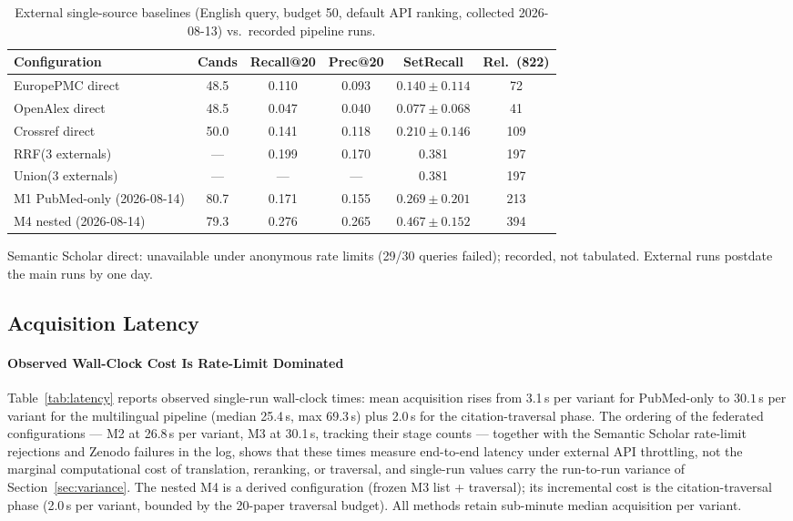 \documentclass[nonacm,sigconf]{acmart}
\begin{document}
\begin{table}[t]
\centering
\small
\setlength{\tabcolsep}{3.6pt}
\begin{threeparttable}
\caption{External single-source baselines (English query, budget 50,
default API ranking, collected 2026-08-13) vs.\ recorded pipeline runs.}
\label{tab:external}
\footnotesize
\begin{tabular}{@{}lccccc@{}}
\toprule
Configuration & Cands & Recall@20 & Prec@20 & SetRecall & Rel.\ (822) \\
\midrule
EuropePMC direct & 48.5 & 0.110 & 0.093 & $0.140\pm0.114$ & 72 \\
OpenAlex direct & 48.5 & 0.047 & 0.040 & $0.077\pm0.068$ & 41 \\
Crossref direct & 50.0 & 0.141 & 0.118 & $0.210\pm0.146$ & 109 \\
RRF(3 externals) & --- & 0.199 & 0.170 & 0.381 & 197 \\
Union(3 externals) & --- & --- & --- & 0.381 & 197 \\
\midrule
M1 PubMed-only (2026-08-14) & 80.7 & 0.171 & 0.155 & $0.269\pm0.201$ & 213 \\
M4 nested (2026-08-14) & 79.3 & 0.276 & 0.265 & $0.467\pm0.152$ & 394 \\
\bottomrule
\end{tabular}
\begin{tablenotes}
\item Semantic Scholar direct: unavailable under anonymous rate limits
(29/30 queries failed); recorded, not tabulated. External runs postdate
the main runs by one day.
\end{tablenotes}
\end{threeparttable}
\end{table}

\subsection{Acquisition Latency}
\label{sec:latency}

\paragraph{Observed Wall-Clock Cost Is Rate-Limit Dominated}
Table~\ref{tab:latency} reports observed single-run wall-clock times:
mean acquisition rises from 3.1\,s per variant for PubMed-only to
$30.1$\,s per variant for the multilingual pipeline (median 25.4\,s, max
69.3\,s) plus 2.0\,s for the citation-traversal phase. The ordering of the
federated configurations --- M2 at 26.8\,s per variant, M3 at 30.1\,s,
tracking their stage counts --- together with the Semantic Scholar
rate-limit rejections and Zenodo failures in the log, shows that these
times measure end-to-end latency under external API throttling, not the
marginal computational cost of translation, reranking, or traversal, and
single-run values carry the run-to-run variance of Section~\ref{sec:variance}. The
nested M4 is a derived configuration (frozen M3 list + traversal); its
incremental cost is the citation-traversal phase (2.0\,s per variant,
bounded by the 20-paper traversal budget). All methods retain sub-minute
median acquisition per variant.
\end{document}
